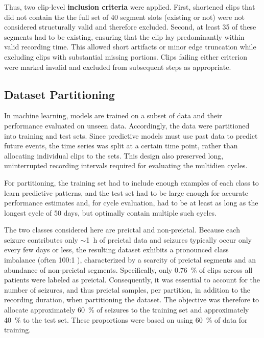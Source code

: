 Thus, two clip-level \textbf{inclusion criteria} were applied.
First, shortened clips that did not contain the the full set of 40 segment slots (existing or not) were not considered structurally valid and therefore excluded.
Second, at least 35 of these segments had to be existing, ensuring that the clip lay predominantly within valid recording time.
This allowed short artifacts or minor edge truncation while excluding clips with substantial missing portions.
Clips failing either criterion were marked invalid and excluded from subsequent steps as appropriate.


\subsection{Dataset Partitioning} \label{subsec:dataset-partitioning}
In machine learning, models are trained on a subset of data and their performance evaluated on unseen data.
Accordingly, the data were partitioned into training and test sets.
Since predictive models must use past data to predict future events, the time series was split at a certain time point, rather than allocating individual clips to the sets.
This design also preserved long, uninterrupted recording intervals required for evaluating the multidien cycles.

For partitioning, the training set had to include enough examples of each class to learn predictive patterns, and the test set had to be large enough for accurate performance estimates and, for cycle evaluation, had to be at least as long as the longest cycle of 50 days, but optimally contain multiple such cycles.

The two classes considered here are preictal and non-preictal.
Because each seizure contributes only $\sim$\SI{1}{\hour} of preictal data and seizures typically occur only every few days or less, the resulting dataset exhibits a pronounced class imbalance (often 100:1 \parencite{brinkmann_crowdsourcing_2016}), characterized by a scarcity of preictal segments and an abundance of non-preictal segments.
Specifically, only \SI{0.76}{\percent} of clips across all patients were labeled as preictal.
Consequently, it was essential to account for the number of seizures, and thus preictal samples, per partition, in addition to the recording duration, when partitioning the dataset.
The objective was therefore to allocate approximately \SI{60}{\percent} of seizures to the training set and approximately \SI{40}{\percent} to the test set.
These proportions were based on \textcite{yang_seizure_2024} using \SI{60}{\percent} of data for training.

